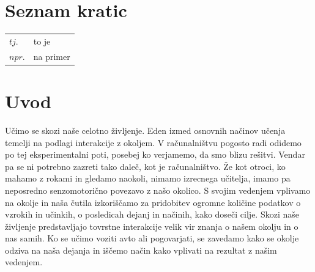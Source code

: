 \documentclass[a4paper, oneside, 12pt]{report}
\newcommand\nomenclature[2]{#1 & #2 \\}
\begin{document}
\tableofcontents
\thispagestyle{fancy}
\newpage

\listoftables
\thispagestyle{fancy}
\newpage

\listoffigures
\thispagestyle{fancy}
\newpage


\chapter*{Seznam kratic}
\thispagestyle{fancy}
\begin{longtable}{@{}p{1cm}@{}p{\dimexpr\textwidth-1cm\relax}@{}}
\nomenclature{$tj.$}{to je}
\nomenclature{$npr.$}{na primer}
\end{longtable}
\newpage


\chapter{Uvod}
\thispagestyle{fancy}
Učimo se skozi naše celotno življenje. Eden izmed osnovnih načinov učenja temelji na podlagi interakcije z okoljem. V računalništvu pogosto radi odidemo po tej eksperimentalni poti, posebej ko verjamemo, da smo blizu rešitvi. Vendar pa se ni potrebno zazreti tako daleč, kot je računalništvo. Že kot otroci, ko mahamo z rokami in gledamo naokoli, nimamo izrecnega učitelja, imamo pa neposredno senzomotorično povezavo z našo okolico. S svojim vedenjem vplivamo na okolje in naša čutila izkoriščamo za pridobitev ogromne količine podatkov o vzrokih in učinkih, o posledicah dejanj in načinih, kako doseči cilje. Skozi naše življenje predstavljajo tovrstne interakcije velik vir znanja o našem okolju in o nas samih. Ko se učimo voziti avto ali pogovarjati, se zavedamo kako se okolje odziva na naša dejanja in iščemo način kako vplivati na rezultat z našim vedenjem.
\end{document}
